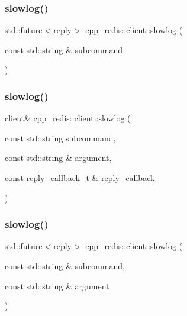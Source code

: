 \subsubsection{\texorpdfstring{slowlog()}{slowlog()}\hspace{0.1cm}{\footnotesize\ttfamily [2/4]}}
{\footnotesize\ttfamily std\+::future$<$\hyperlink{classcpp__redis_1_1reply}{reply}$>$ cpp\+\_\+redis\+::client\+::slowlog (\begin{DoxyParamCaption}\item[{const std\+::string \&}]{subcommand }\end{DoxyParamCaption})}

\mbox{\label{classcpp__redis_1_1client_a62bc37eb1ef8a3b09ca58c091085c89b}} 
\subsubsection{\texorpdfstring{slowlog()}{slowlog()}\hspace{0.1cm}{\footnotesize\ttfamily [3/4]}}
{\footnotesize\ttfamily \hyperlink{classcpp__redis_1_1client}{client}\& cpp\+\_\+redis\+::client\+::slowlog (\begin{DoxyParamCaption}\item[{const std\+::string}]{subcommand,  }\item[{const std\+::string \&}]{argument,  }\item[{const \hyperlink{classcpp__redis_1_1client_a061a1140d36d2eaeda82b09a0bb3f9f2}{reply\+\_\+callback\+\_\+t} \&}]{reply\+\_\+callback }\end{DoxyParamCaption})}

\mbox{\label{classcpp__redis_1_1client_a4b3b0c8b11cc1e7f0bdb827eba6f7dc3}} 
\subsubsection{\texorpdfstring{slowlog()}{slowlog()}\hspace{0.1cm}{\footnotesize\ttfamily [4/4]}}
{\footnotesize\ttfamily std\+::future$<$\hyperlink{classcpp__redis_1_1reply}{reply}$>$ cpp\+\_\+redis\+::client\+::slowlog (\begin{DoxyParamCaption}\item[{const std\+::string \&}]{subcommand,  }\item[{const std\+::string \&}]{argument }\end{DoxyParamCaption})}

